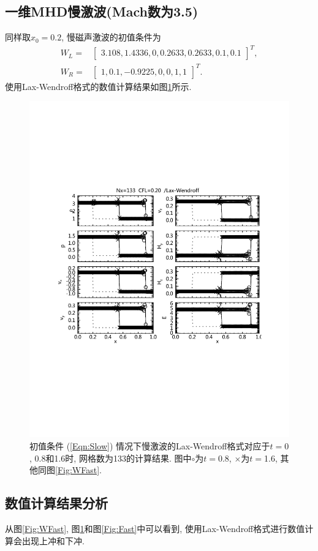 \documentclass[10.5pt
]{article}
\begin{document}
\subsection{一维MHD慢激波(Mach数为3.5)\citep{Dai1994}}
同样取$x_0 = 0.2$, 慢磁声激波的初值条件为
\begin{align}
W_L =& \left[\begin{array}{ccccccc}
3.108,
1.4336,
0,
0.2633,
0.2633,
0.1,
0.1
\end{array}\right]^T,
\nonumber\\
W_R =& \left[\begin{array}{ccccccc}
1,
0.1,
-0.9225,
0,
0,
1,
1
\end{array}\right]^T.\label{Eqn:Slow}
\end{align}
使用Lax-Wendroff格式的数值计算结果如图\ref{Fig:Slow}所示.
\begin{figure}[htb]
\begin{center}
\includegraphics[height=.78\textwidth]{hw4_lw_2s.pdf}
\caption{初值条件 (\ref{Eqn:Slow}) 情况下慢激波的Lax-Wendroff格式对应于$t=0$, 0.8和1.6时, 网格数为133的计算结果. 图中$\circ$为$t=$0.8, $\times$为$t=$1.6, 其他同图\ref{Fig:WFast}. }\label{Fig:Slow}
\end{center}
\end{figure}

\subsection{数值计算结果分析}
从图\ref{Fig:WFast}, 图\ref{Fig:Slow}和图\ref{Fig:Fast}中可以看到, 使用Lax-Wendroff格式进行数值计算会出现上冲和下冲.
\end{document}
